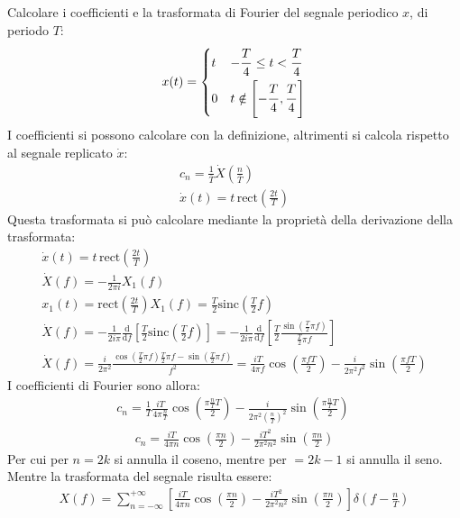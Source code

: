 \documentclass{article}
\newcommand{\rect}{\mbox{rect}}
\newcommand{\sinc}{\mbox{sinc}}
\newcommand{\df}{\mathrm{d}}
\begin{document}
Calcolare i coefficienti e la trasformata di Fourier del segnale periodico $x$, di periodo $T$:
\begin{gather*}
    x(t)=\begin{cases}
        t&\displaystyle-\frac{\strut T}{\strut 4}\leq t<\frac{\strut T}{\strut 4}\\
        0&t\notin\left[\displaystyle-\frac{\strut T}{\strut 4},\frac{\strut T}{\strut 4}\right]
    \end{cases}
\end{gather*}
I coefficienti si possono calcolare con la definizione, altrimenti si calcola rispetto al segnale replicato $\dot x$:
\begin{gather*}
    c_n=\displaystyle\frac{1}{\overline{T}}\dot X\left(\frac{n}{\overline{T}}\right)\\
    \dot x(t)=t\,\rect\left(\displaystyle\frac{2t}{T}\right)
\end{gather*}
Questa trasformata si può calcolare mediante la proprietà della derivazione della trasformata:
\begin{gather*}
    \dot x(t)=t\,\rect\displaystyle\left(\frac{2t}{T}\right)\\
    \dot X(f)=\displaystyle-\frac{1}{2\pi i}X_1(f)\\
    x_1(t)=\rect\displaystyle\left(\frac{2t}{T}\right)
    X_1(f)=\displaystyle\frac{T}{2}\sinc\left(\frac{T}{2}f\right)\\
    \dot X(f)=-\displaystyle\frac{1}{2i\pi} \frac{\df}{\df f}\left[\frac{T}{2}\sinc\left(\frac{T}{2}f\right)\right]=-\frac{1}{2i\pi}\frac{\df}{\df f}\left[\frac{T}{2}\frac{\sin\left(\frac{T}{2}\pi f\right)}{\frac{T}{2}\pi f}\right]\\
    \dot X(f)=\displaystyle\frac{i}{2\pi^2}\frac{\cos\left(\frac{T}{2}\pi f\right)\frac{T}{2}\pi f-\sin\left(\frac{T}{2}\pi f\right)}{f^2}=\frac{iT}{4\pi f}\cos\left(\frac{\pi fT}{2}\right)-\frac{i}{2\pi^2f^2}\sin\left(\frac{\pi fT}{2}\right)
\end{gather*}
I coefficienti di Fourier sono allora:
\begin{gather*}
    c_n=\displaystyle\frac{1}{T}\frac{iT}{4\pi \frac{n}{T}}\cos\left(\frac{\pi \frac{n}{T}T}{2}\right)-\frac{i}{2\pi^2\left(\frac{n}{T}\right)^2}\sin\left(\frac{\pi \frac{n}{T}T}{2}\right)\
\end{gather*}
\begin{gather}
    c_n=\displaystyle\frac{iT}{4\pi n}\cos\left(\frac{\pi n}{2}\right)-\frac{iT^2}{2\pi^2n^2}\sin\left(\frac{\pi n}{2}\right)
\end{gather}
Per cui per $n=2k$ si annulla il coseno, mentre per $=2k-1$ si annulla il seno. Mentre la trasformata del segnale risulta essere:
\begin{gather}
    X(f)=\displaystyle\sum_{n=-\infty}^{+\infty}\left[\frac{iT}{4\pi n}\cos\left(\frac{\pi n}{2}\right)-\frac{iT^2}{2\pi^2n^2}\sin\left(\frac{\pi n}{2}\right)\right]\delta\left(f-\frac{n}{T}\right)
\end{gather}
\end{document}
